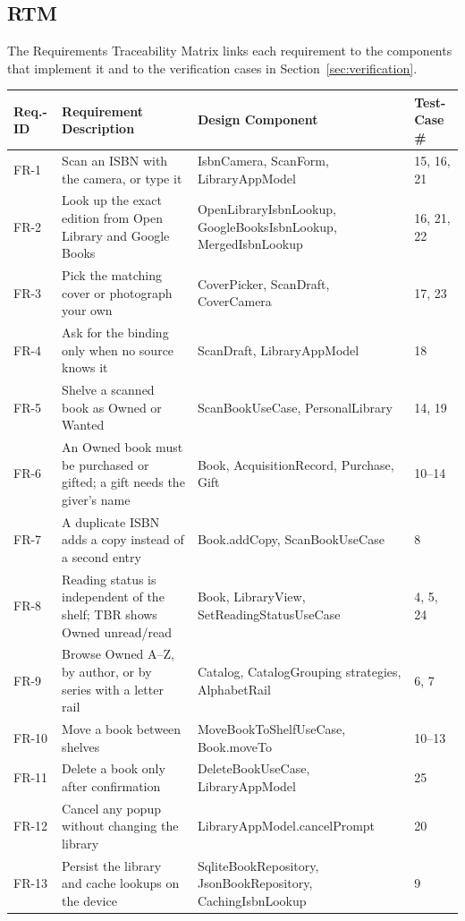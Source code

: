\documentclass[12pt]{article}
\begin{document}
\subsection{RTM}

The Requirements Traceability Matrix links each requirement to the components that implement it and to the verification cases in Section~\ref{sec:verification}.

\begin{longtable}{|L{1.6cm}|L{5.2cm}|L{4.6cm}|L{2.6cm}|}
\hline
\textbf{Req.-ID} & \textbf{Requirement Description} & \textbf{Design Component} & \textbf{Test-Case \#} \\
\hline
\endhead
FR-1 & Scan an ISBN with the camera, or type it & IsbnCamera, ScanForm, LibraryAppModel & 15, 16, 21 \\ \hline
FR-2 & Look up the exact edition from Open Library and Google Books & OpenLibraryIsbnLookup, GoogleBooksIsbnLookup, MergedIsbnLookup & 16, 21, 22 \\ \hline
FR-3 & Pick the matching cover or photograph your own & CoverPicker, ScanDraft, CoverCamera & 17, 23 \\ \hline
FR-4 & Ask for the binding only when no source knows it & ScanDraft, LibraryAppModel & 18 \\ \hline
FR-5 & Shelve a scanned book as Owned or Wanted & ScanBookUseCase, PersonalLibrary & 14, 19 \\ \hline
FR-6 & An Owned book must be purchased or gifted; a gift needs the giver's name & Book, AcquisitionRecord, Purchase, Gift & 10--14 \\ \hline
FR-7 & A duplicate ISBN adds a copy instead of a second entry & Book.addCopy, ScanBookUseCase & 8 \\ \hline
FR-8 & Reading status is independent of the shelf; TBR shows Owned unread/read & Book, LibraryView, SetReadingStatusUseCase & 4, 5, 24 \\ \hline
FR-9 & Browse Owned A--Z, by author, or by series with a letter rail & Catalog, CatalogGrouping strategies, AlphabetRail & 6, 7 \\ \hline
FR-10 & Move a book between shelves & MoveBookToShelf\-UseCase, Book.moveTo & 10--13 \\ \hline
FR-11 & Delete a book only after confirmation & DeleteBookUseCase, LibraryAppModel & 25 \\ \hline
FR-12 & Cancel any popup without changing the library & LibraryAppModel\allowbreak.cancelPrompt & 20 \\ \hline
FR-13 & Persist the library and cache lookups on the device & SqliteBookRepository, JsonBookRepository, CachingIsbnLookup & 9 \\ \hline

\end{longtable}
\end{document}
